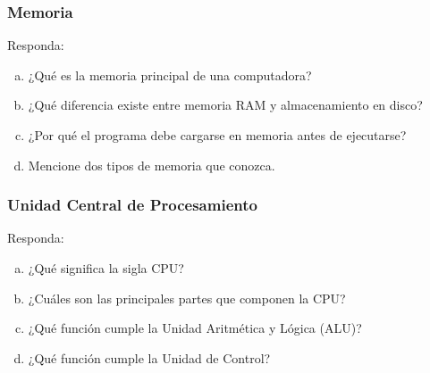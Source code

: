 \subsubsection{Memoria}
Responda:
\begin{enumerate}[a)]
  \item ¿Qué es la memoria principal de una computadora?
  \item ¿Qué diferencia existe entre memoria RAM y almacenamiento en disco?
  \item ¿Por qué el programa debe cargarse en memoria antes de ejecutarse?
  \item Mencione dos tipos de memoria que conozca.
\end{enumerate}

\subsubsection{Unidad Central de Procesamiento}
Responda:
\begin{enumerate}[a)]
  \item ¿Qué significa la sigla CPU?
  \item ¿Cuáles son las principales partes que componen la CPU?
  \item ¿Qué función cumple la Unidad Aritmética y Lógica (ALU)?
  \item ¿Qué función cumple la Unidad de Control?
\end{enumerate}
